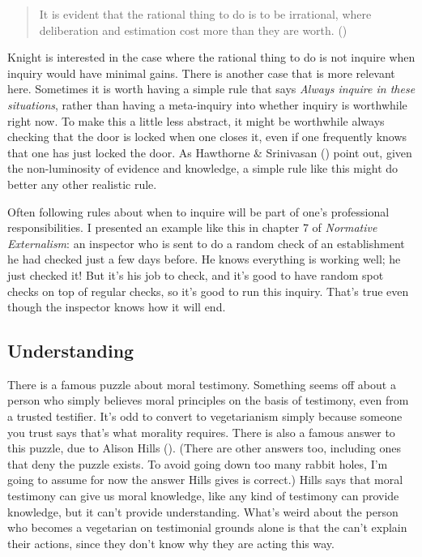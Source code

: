 \documentclass[
  10pt,
  letterpaper,
  twoside]{scrbook}
\begin{document}
\begin{quote}
It is evident that the rational thing to do is to be irrational, where
deliberation and estimation cost more than they are worth.
()
\end{quote}

Knight is interested in the case where the rational thing to do is not
inquire when inquiry would have minimal gains. There is another case
that is more relevant here. Sometimes it is worth having a simple rule
that says \emph{Always inquire in these situations}, rather than having
a meta-inquiry into whether inquiry is worthwhile right now. To make
this a little less abstract, it might be worthwhile always checking that
the door is locked when one closes it, even if one frequently knows that
one has just locked the door. As Hawthorne \& Srinivasan
() point out, given the
non-luminosity of evidence and knowledge, a simple rule like this might
do better any other realistic rule.

Often following rules about when to inquire will be part of one's
professional responsibilities. I presented an example like this in
chapter 7 of \emph{Normative Externalism}: an inspector who is sent to
do a random check of an establishment he had checked just a few days
before. He knows everything is working well; he just checked it! But
it's his job to check, and it's good to have random spot checks on top
of regular checks, so it's good to run this inquiry. That's true even
though the inspector knows how it will end.

\subsection{Understanding}\label{sec-understandinginquiry}

There is a famous puzzle about moral testimony. Something seems off
about a person who simply believes moral principles on the basis of
testimony, even from a trusted testifier. It's odd to convert to
vegetarianism simply because someone you trust says that's what morality
requires. There is also a famous answer to this puzzle, due to Alison
Hills (). (There are other answers too,
including ones that deny the puzzle exists. To avoid going down too many
rabbit holes, I'm going to assume for now the answer Hills gives is
correct.) Hills says that moral testimony can give us moral knowledge,
like any kind of testimony can provide knowledge, but it can't provide
understanding. What's weird about the person who becomes a vegetarian on
testimonial grounds alone is that the can't explain their actions, since
they don't know why they are acting this way.
\end{document}

